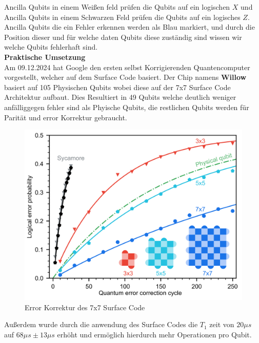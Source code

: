 Ancilla Qubits in einem Weißen feld prüfen die Qubits auf ein logischen $X$ und Ancilla Qubits in einem Schwarzen Feld prüfen die Qubits auf ein logisches $Z$.\\

Ancilla Qubits die ein Fehler erkennen werden als Blau markiert, und durch die Position dieser und für welche daten Qubits diese zuständig sind wissen wir welche Qubits fehlerhaft sind.\\

\textbf{Praktische Umsetzung}\\
Am 09.12.2024 hat Google den ersten selbst Korrigierenden Quantencomputer vorgestellt, welcher auf dem Surface Code basiert.
Der Chip namens \textbf{Willow} basiert auf 105 Physischen Qubits wobei diese auf der 7x7 Surface Code Architektur aufbaut.
Dies Resultiert in 49 Qubits welche deutlich weniger anfälliggegen fehler sind als Phyische Qubits, die restlichen Qubits werden für Parität und error Korrektur gebraucht.\\

\begin{figure}[H]
    \centering
    \includegraphics[width=0.7\linewidth]{img/Surface-Code-Scaling.png}
    \caption{Error Korrektur des 7x7 Surface Code}
    \label{fig:Willow}
\end{figure}

Außerdem wurde durch die anwendung des Surface Codes die $T_1$ zeit von $20\mu s$ auf $68\mu s\pm13\mu s$ erhöht und ermöglich hierdurch mehr Operationen pro Qubit.\\